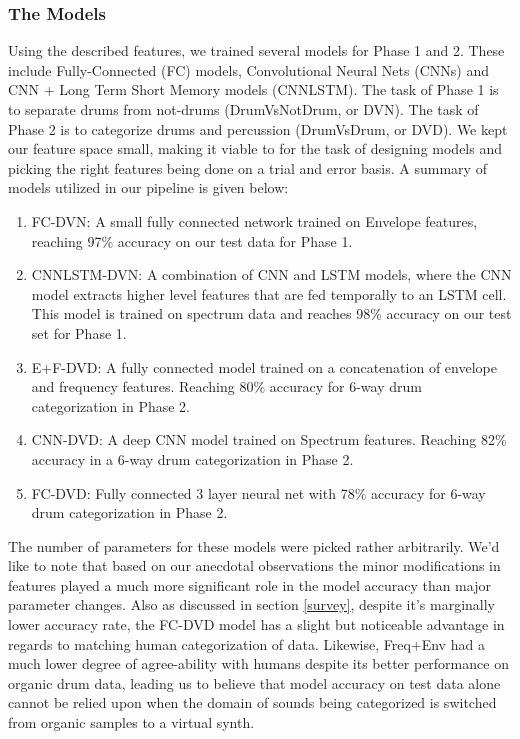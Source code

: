 \documentclass{nime-alternate} %
\begin{document}
\subsubsection{The Models}
Using the described features, we trained several models for Phase 1 and 2. These include Fully-Connected (FC) models, Convolutional Neural Nets (CNNs) and CNN + Long Term Short Memory models (CNNLSTM). The task of Phase 1 is to separate drums from not-drums (DrumVsNotDrum, or DVN). The task of Phase 2 is to categorize drums and percussion (DrumVsDrum, or DVD). We kept our feature space small, making it viable to for the task of designing models and picking the right features being done on a trial and error basis. A summary of models utilized in our pipeline is given below:
\begin {enumerate}
\item FC-DVN: A small fully connected network trained on Envelope features, reaching 97\% accuracy on our test data for Phase 1. 
\item CNNLSTM-DVN: A combination of CNN and LSTM models, where the CNN model extracts higher level features that are fed temporally to an LSTM cell. This model is trained on spectrum data and reaches 98\% accuracy on our test set for Phase 1.
\item E+F-DVD: A fully connected model trained on a concatenation of envelope and frequency features. Reaching 80\% accuracy for 6-way drum categorization in Phase 2.
\item CNN-DVD: A deep CNN model trained on Spectrum features. Reaching 82\% accuracy in a 6-way drum categorization in Phase 2. 
\item FC-DVD: Fully connected 3 layer neural net with 78\% accuracy for 6-way drum categorization in Phase 2. 
\end{enumerate}
The number of parameters for these models were picked rather arbitrarily. We'd like to note that based on our anecdotal observations the minor modifications in features played a much more significant role in the model accuracy than major parameter changes. Also as discussed in section \ref{survey}, despite it's marginally lower accuracy rate, the FC-DVD model has a slight but noticeable advantage in regards to matching human categorization of data. Likewise, Freq+Env had a much lower degree of agree-ability with humans despite its better performance on organic drum data, leading us to believe that model accuracy on test data alone cannot be relied upon when the domain of sounds being categorized is switched from organic samples to a virtual synth. \\
\end{document}
